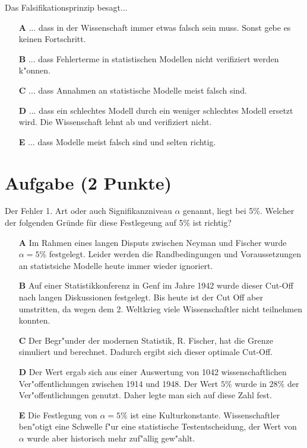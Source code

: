 \documentclass[a4paper, 10pt]{scrartcl}\usepackage[]{graphicx}\usepackage[]{xcolor}
\begin{document}
Das Falsifikationsprinzip besagt... 



\begin{enumerate}
\item [\textbf{A} \msquare] ... dass in der Wissenschaft immer etwas falsch sein muss. Sonst gebe es keinen Fortschritt.
\item [\textbf{B} \msquare] ... dass Fehlerterme in statistischen Modellen nicht verifiziert werden k{"o}nnen.
\item [\textbf{C} \msquare] ... dass Annahmen an statistische Modelle meist falsch sind.
\item [\textbf{D} \msquare] ... dass ein schlechtes Modell durch ein weniger schlechtes Modell ersetzt wird. Die Wissenschaft lehnt ab und verifiziert nicht.
\item [\textbf{E} \msquare] ... dass Modelle meist falsch sind und selten richtig.
\end{enumerate}

\section{Aufgabe \hfill (2 Punkte)}

Der Fehler 1. Art oder auch Signifikanzniveau $\alpha$ genannt, liegt bei
5\%. Welcher der folgenden Gr{\"u}nde f{\"u}r diese Festlegeung auf 5\% ist richtig?



\begin{enumerate}
\item [\textbf{A} \msquare] Im Rahmen eines langen Disputs zwischen Neyman und Fischer wurde $\alpha = 5\%$ festgelegt. Leider werden die Randbedingungen und Voraussetzungen an statistsiche Modelle heute immer wieder ignoriert.
\item [\textbf{B} \msquare] Auf einer Statistikkonferenz in Genf im Jahre 1942 wurde dieser Cut-Off nach langen Diskussionen festgelegt. Bis heute ist der Cut Off aber umstritten, da wegen dem 2. Weltkrieg viele Wissenschaftler nicht teilnehmen konnten.
\item [\textbf{C} \msquare] Der Begr{"u}nder der modernen Statistik, R. Fischer, hat die Grenze simuliert und berechnet. Dadurch ergibt sich dieser optimale Cut-Off.
\item [\textbf{D} \msquare] Der Wert ergab sich aus einer Auswertung von 1042 wissenschaftlichen Ver{"o}ffentlichungen zwischen 1914 und 1948. Der Wert $5\%$ wurde in $28\%$ der Ver{"o}ffentlichungen genutzt. Daher legte man sich auf diese Zahl fest.
\item [\textbf{E} \msquare] Die Festlegung von $\alpha = 5\%$ ist eine Kulturkonstante. Wissenschaftler ben{"o}tigt eine Schwelle f{"u}r eine statistische Testentscheidung, der Wert von $\alpha$ wurde aber historisch mehr zuf{"a}llig gew{"a}hlt.
\end{enumerate}
\end{document}
